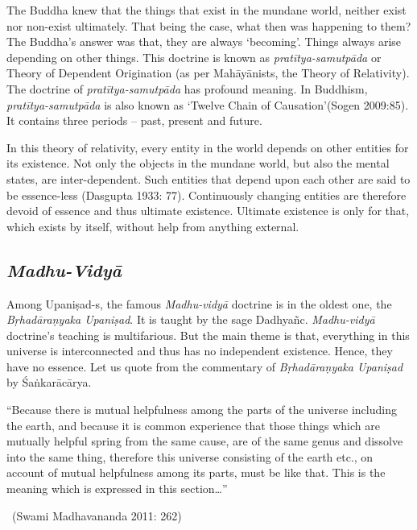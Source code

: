 The Buddha knew that the things that exist in the mundane world, neither exist nor non-exist ultimately. That being the case, what then was happening to them? The Buddha’s answer was that, they are always ‘becoming’. Things always arise depending on other things. This doctrine is known as \textit{pratītya-samutpāda} or Theory of Dependent Origination (as per Mahāyānists, the Theory of Relativity). The doctrine of \textit{pratītya-samutpāda} has profound meaning. In Buddhism, \textit{pratītya-samutpāda} is also known as ‘Twelve Chain of Causation’(Sogen 2009:85). It contains three periods – past, present and future.

In this theory of relativity, every entity in the world depends on other entities for its existence. Not only the objects in the mundane world, but also the mental states, are inter-dependent. Such entities that depend upon each other are said to be essence-less (Dasgupta 1933: 77). Continuously changing entities are therefore devoid of essence and thus ultimate existence. Ultimate existence is only for that, which exists by itself, without help from anything external.

\subsection*{\textit{Madhu-Vidyā}}

\vspace{-.3cm}

Among Upaniṣad-s, the famous \textit{Madhu-vidyā} doctrine is in the oldest one, the \textit{Bṛhadāraṇyaka Upaniṣad}. It is taught by the sage Dadhyañc. \textit{Madhu-vidyā} doctrine’s teaching is multifarious. But the main theme is that, everything in this universe is interconnected and thus has no independent existence. Hence, they have no essence. Let us quote from the commentary of \textit{Bṛhadāraṇyaka Upaniṣad} by Śaṅkarācārya.

\begin{myquote}
“Because there is mutual helpfulness among the parts of the universe including the earth, and because it is common experience that those things which are mutually helpful spring from the same cause, are of the same genus and dissolve into the same thing, therefore this universe consisting of the earth etc., on account of mutual helpfulness among its parts, must be like that. This is the meaning which is expressed in this section…” 

~\hfill (Swami Madhavananda 2011: 262)
\end{myquote}

